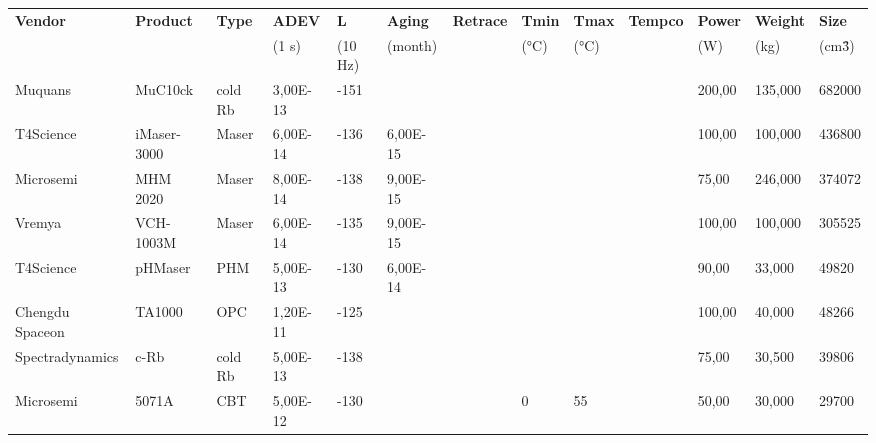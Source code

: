 ﻿\begin{table}
    \centering
    \begin{tabular}{ll|lllllllllll}
        \hline
        \textbf{Vendor} & \textbf{Product} & \textbf{Type} & \textbf{ADEV} & \textbf{L} & \textbf{Aging} & \textbf{Retrace} & \textbf{Tmin} & \textbf{Tmax} & \textbf{Tempco} & \textbf{Power} & \textbf{Weight} & \textbf{Size} \\
        ~               & ~                & ~             & (1 s)         & (10 Hz)    & (month)        & ~                & (°C)          & (°C)          & ~               & (W)            & (kg)            & (cm\^3)       \\
        \hline
        Muquans         & MuC10ck          & cold Rb       & 3,00E-13      & -151       & ~              & ~                & ~             & ~             & ~               & 200,00         & 135,000         & 682000        \\
        T4Science       & iMaser-3000      & Maser         & 6,00E-14      & -136       & 6,00E-15       & ~                & ~             & ~             & ~               & 100,00         & 100,000         & 436800        \\
        Microsemi       & MHM 2020         & Maser         & 8,00E-14      & -138       & 9,00E-15       & ~                & ~             & ~             & ~               & 75,00          & 246,000         & 374072        \\
        Vremya          & VCH-1003M        & Maser         & 6,00E-14      & -135       & 9,00E-15       & ~                & ~             & ~             & ~               & 100,00         & 100,000         & 305525        \\
        T4Science       & pHMaser          & PHM           & 5,00E-13      & -130       & 6,00E-14       & ~                & ~             & ~             & ~               & 90,00          & 33,000          & 49820         \\
        Chengdu Spaceon & TA1000           & OPC           & 1,20E-11      & -125       & ~              & ~                & ~             & ~             & ~               & 100,00         & 40,000          & 48266         \\
        Spectradynamics & c-Rb             & cold Rb       & 5,00E-13      & -138       & ~              & ~                & ~             & ~             & ~               & 75,00          & 30,500          & 39806         \\
        Microsemi       & 5071A            & CBT           & 5,00E-12      & -130       & ~              & ~                & 0             & 55            & ~               & 50,00          & 30,000          & 29700         \\

\end{tabular}
\end{table}
